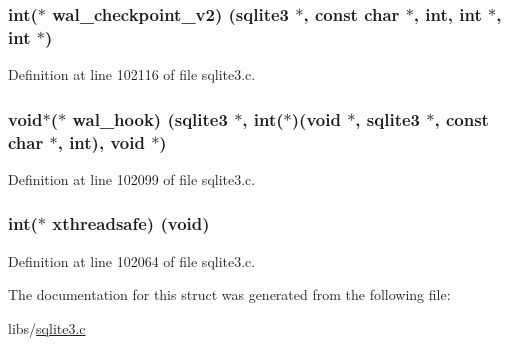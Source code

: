 \subsubsection[{wal\+\_\+checkpoint\+\_\+v2}]{\setlength{\rightskip}{0pt plus 5cm}int($\ast$ wal\+\_\+checkpoint\+\_\+v2) ({\bf sqlite3} $\ast$, const char $\ast$, int, int $\ast$, int $\ast$)}\label{structsqlite3__api__routines_aad374c8fe2ba7b9ffa27a33ce46433a9}


Definition at line 102116 of file sqlite3.\+c.

\hypertarget{structsqlite3__api__routines_a57c617f1b3746de420874110e58e15f7}{}
\subsubsection[{wal\+\_\+hook}]{\setlength{\rightskip}{0pt plus 5cm}void$\ast$($\ast$ wal\+\_\+hook) ({\bf sqlite3} $\ast$, int($\ast$)(void $\ast$, {\bf sqlite3} $\ast$, const char $\ast$, int), void $\ast$)}\label{structsqlite3__api__routines_a57c617f1b3746de420874110e58e15f7}


Definition at line 102099 of file sqlite3.\+c.

\hypertarget{structsqlite3__api__routines_a08f3a80dbc09846ef724b924ecea4887}{}
\subsubsection[{xthreadsafe}]{\setlength{\rightskip}{0pt plus 5cm}int($\ast$ xthreadsafe) (void)}\label{structsqlite3__api__routines_a08f3a80dbc09846ef724b924ecea4887}


Definition at line 102064 of file sqlite3.\+c.



The documentation for this struct was generated from the following file\+:\begin{DoxyCompactItemize}
\item 
libs/\hyperlink{sqlite3_8c}{sqlite3.\+c}\end{DoxyCompactItemize}
